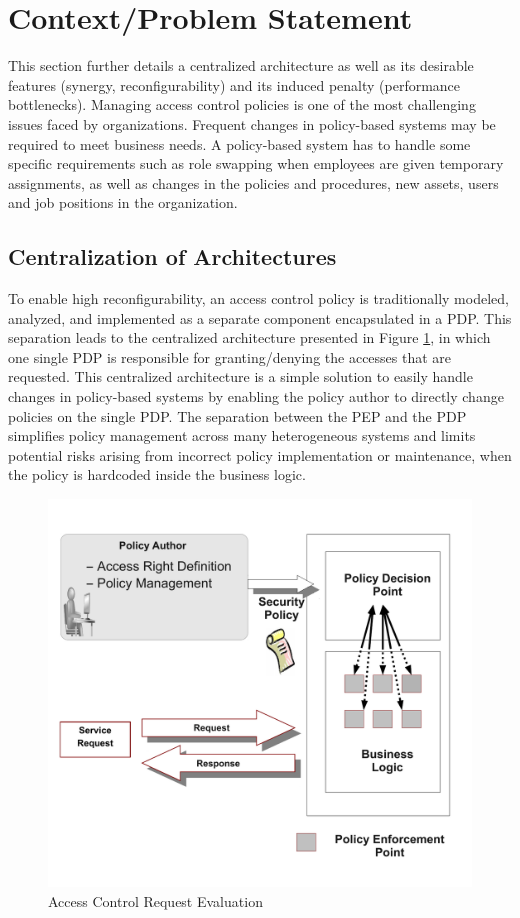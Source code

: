 
\section{Context/Problem Statement} \label{sec:context}
This section further details a centralized architecture as well as its desirable features (synergy, reconfigurability) and its induced penalty (performance bottlenecks). 
Managing access control policies is one of the most challenging issues faced by organizations. Frequent changes in policy-based systems may be required to meet business needs. 
A policy-based system has to handle some specific requirements such as role swapping when employees are given temporary assignments, as well as changes in the policies and procedures, 
new assets, users and job positions in the organization.

\subsection{Centralization of Architectures}
To enable high reconfigurability, an access control policy is traditionally modeled, analyzed, and implemented as a separate component 
encapsulated in a PDP. This separation leads to the centralized architecture presented in Figure \ref{pep-pdp}, in which one single PDP is responsible for granting/denying the accesses that are requested. 
This centralized architecture is a simple solution to easily handle changes in policy-based systems by enabling the policy author 
to directly change policies on the single PDP. The separation between the PEP and the PDP simplifies policy management across many heterogeneous systems and limits
potential risks arising from incorrect policy implementation or maintenance, when the policy is hardcoded inside the business logic.
\begin{figure}[!h]
\begin{center}
\includegraphics[scale=0.38]{business-logic}
\caption{Access Control Request Evaluation}
\label{pep-pdp}
\end{center}
\end{figure}
